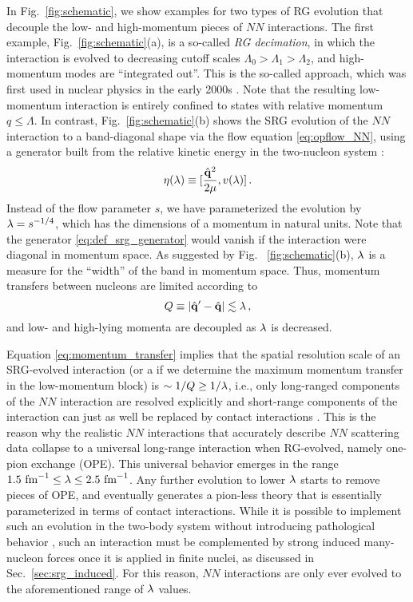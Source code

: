 {In Fig.~\ref{fig:schematic}, we show examples for two types of RG evolution
that decouple the low- and high-momentum pieces of $NN$ interactions. The first
example, Fig.~\ref{fig:schematic}(a), is a so-called  \emph{RG decimation}, 
in which the interaction is evolved to decreasing cutoff scales $\Lambda_0 > \Lambda_1 > \Lambda_2$, 
and high-momentum modes are ``integrated out''. This is the so-called \Vlowk{}
approach, which was first used in nuclear physics in the early 2000s 
\cite{Bogner:2003os,Bogner:2010pq}. Note that the resulting low-momentum 
interaction is entirely confined to states with relative momentum $q\leq\Lambda$.
In contrast, Fig.~\ref{fig:schematic}(b) shows the SRG evolution of the $NN$ interaction
to a band-diagonal shape via the flow equation \eqref{eq:opflow_NN}, using a 
generator built from the relative kinetic energy in the two-nucleon system \cite{Bogner:2007od,Bogner:2010pq}:
\begin{equation}\label{eq:def_srg_generator}
  \eta(\lambda) \equiv \comm{\frac{\qOV^2}{2\mu}}{v(\lambda)}\,.
\end{equation}
Instead of the flow parameter $s$, we have parameterized the evolution by 
$\lambda=s^{-1/4}$, which has the dimensions of a momentum in natural units. 
Note that the generator \eqref{eq:def_srg_generator} would vanish if the
interaction were diagonal in momentum space. As suggested by Fig.~
\ref{fig:schematic}(b), $\lambda$ is a measure for the ``width'' of the 
band in momentum space. Thus, momentum transfers between nucleons are limited 
according to
\begin{equation}\label{eq:momentum_transfer}
  Q\equiv |\qOV' - \qOV| \lesssim \lambdaSRG\,,
\end{equation} 
and low- and high-lying momenta are decoupled as $\lambda$ is decreased. 

Equation \eqref{eq:momentum_transfer} implies that the spatial resolution scale
of an SRG-evolved interaction (or a \Vlowk{} if we determine the maximum
momentum transfer in the low-momentum block) is $\sim 1/Q \geq 1/\lambda$,
i.e., only long-ranged components of the $NN$ interaction are resolved explicitly
and short-range components of the interaction can just as well be replaced 
by contact interactions \cite{Lepage:1997py,Bogner:2003os,Holt:2004ux,Bogner:2010pq}.
This is the reason why the realistic $NN$ interactions that accurately 
describe $NN$ scattering data collapse to a universal long-range interaction
when RG-evolved, namely one-pion exchange (OPE). This universal behavior emerges
in the range $1.5\,\,\text{fm}^{-1}\leq\lambda\leq2.5\,\,\text{fm}^{-1}$. Any further evolution to
lower $\lambda$ starts to remove pieces of OPE, and eventually generates a 
pion-less theory that is essentially parameterized in terms of contact 
interactions. While it is possible to implement such an evolution in
the two-body system without introducing pathological behavior \cite{Wendt:2011ys},
such an interaction must be complemented by strong induced many-nucleon
forces once it is applied in finite nuclei, as discussed in Sec.~\ref{sec:srg_induced}.
For this reason, $NN$ interactions are only ever evolved to the aforementioned
range of $\lambda$ values.

}
